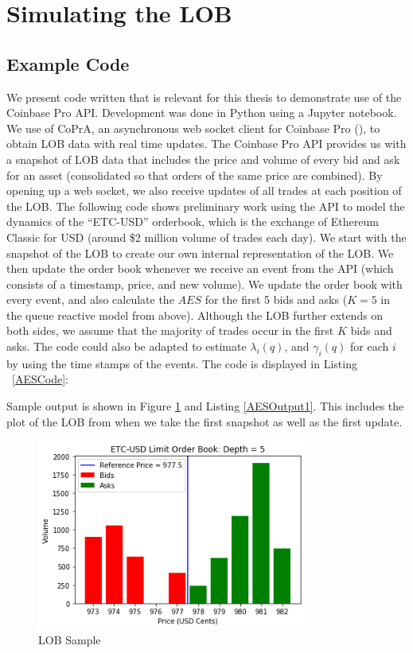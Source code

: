 \section{Simulating the LOB}
\subsection{Example Code}
We present code written that is relevant for this thesis to demonstrate use of the Coinbase Pro API. Development was done in Python using a Jupyter notebook. We use of CoPrA, an asynchronous web socket client for Coinbase Pro (\cite{L3}), to obtain LOB data with real time updates. The Coinbase Pro API provides us with a snapshot of LOB data that includes the price and volume of every bid and ask for an asset (consolidated so that orders of the same price are combined). By opening up a web socket, we also receive updates of all trades at each position of the LOB. The following code shows preliminary work using the API to model the dynamics of the “ETC-USD” orderbook, which is the exchange of Ethereum Classic for USD (around \$2 million volume of trades each day). We start with the snapshot of the LOB to create our own internal representation of the LOB. We then update the order book whenever we receive an event from the API (which consists of a timestamp, price, and new volume). We update the order book with every event, and also calculate the $AES$ for the first 5 bids and asks ($K=5$ in the queue reactive model from above). Although the LOB further extends on both sides, we assume that the majority of trades occur in the first $K$ bids and asks. The code could also be adapted to estimate $\lambda_i(q)$, and $\gamma_i(q)$ for each $i$ by using the time stamps of the events. The code is displayed in Listing ~\ref{AESCode}:



Sample output is shown in Figure \ref{fig:LOB_pic} and Listing \ref{AESOutput1}. This includes the plot of the LOB from when we take the first snapshot as well as the first update.

\begin{figure}[t]
\begin{center}
\includegraphics[width=0.8\textwidth]{Figures/LOB_Picture.png}
\caption{LOB Sample}
\label{fig:LOB_pic}
\end{center}
\end{figure}

